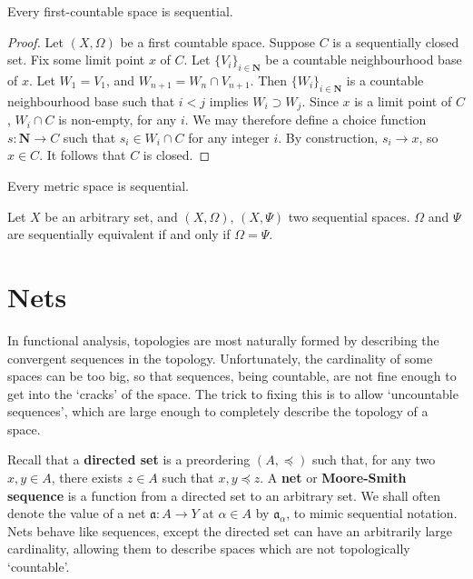 \begin{example}
\begin{lemma}
    Every first-countable space is sequential.
\end{lemma}
\begin{proof}
    Let $(X,\Omega)$ be a first countable space. Suppose $C$ is a sequentially closed set. Fix some limit point $x$ of $C$.  Let $\{ V_i \}_{i \in \mathbf{N}}$ be a countable neighbourhood base of $x$. Let $W_1 = V_1$, and $W_{n+1} = W_n \cap V_{n+1}$. Then $\{ W_i \}_{i \in \mathbf{N}}$ is a countable neighbourhood base such that $i < j$ implies $W_i \supset W_j$. Since $x$ is a limit point of $C$, $W_i \cap C$ is non-empty, for any $i$. We may therefore define a choice function $s: \mathbf{N} \to C$ such that $s_i \in W_i \cap C$ for any integer $i$. By construction, $s_i \to x$, so $x \in C$. It follows that $C$ is closed.
\end{proof}

\begin{corollary}
    Every metric space is sequential.
\end{corollary}

\begin{exercise}
    Let $X$ be an arbitrary set, and $(X, \Omega)$, $(X, \Psi)$ two sequential spaces. $\Omega$ and $\Psi$ are sequentially equivalent if and only if $\Omega = \Psi$.
\end{exercise}

\section{Nets}

In functional analysis, topologies are most naturally formed by describing the convergent sequences in the topology. Unfortunately, the cardinality of some spaces can be too big, so that sequences, being countable, are not fine enough to get into the `cracks' of the space. The trick to fixing this is to allow `uncountable sequences', which are large enough to completely describe the topology of a space.

Recall that a {\bf directed set} is a preordering $(A, \preceq)$ such that, for any two $x,y \in A$, there exists $z \in A$ such that $x,y \preceq z$. A {\bf net} or {\bf Moore-Smith sequence} is a function from a directed set to an arbitrary set. We shall often denote the value of a net $\mathfrak{a}:A \to Y$ at $\alpha \in A$ by $\mathfrak{a}_\alpha$, to mimic sequential notation. Nets behave like sequences, except the directed set can have an arbitrarily large cardinality, allowing them to describe spaces which are not topologically `countable'.


\end{example}
